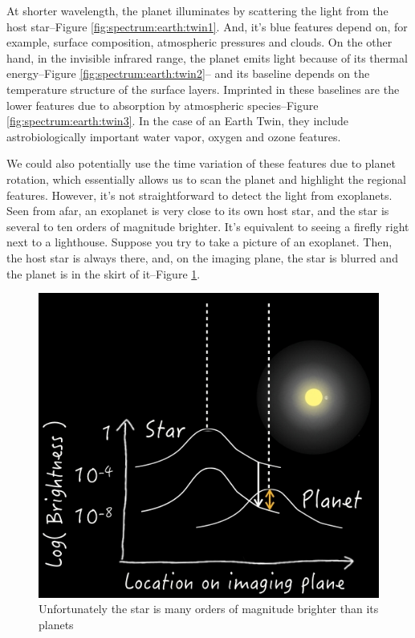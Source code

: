 \documentclass[]{article}
\begin{document}
At shorter wavelength,
the planet illuminates
by scattering the light
from the host star--Figure \ref{fig:spectrum:earth:twin1}.
And, it's blue features depend on,
for example,
surface composition,
atmospheric pressures and clouds.
On the other hand,
in the invisible infrared range,
the planet emits light
because of its thermal energy--Figure \ref{fig:spectrum:earth:twin2}--
and its baseline depends on
the temperature structure
of the surface layers.
Imprinted in these baselines
are the lower features
due to absorption
by atmospheric species--Figure \ref{fig:spectrum:earth:twin3}.
In the case of an Earth Twin,
they include astrobiologically important
water vapor, oxygen
and ozone features.

We could also potentially use
the time variation of these features
due to planet rotation,
which essentially allows us
to scan the planet
and highlight the regional features.
However, it's not straightforward
to detect the light from exoplanets.
Seen from afar, an exoplanet is
very close to its own host star,
and the star is several to ten
orders of magnitude brighter.
It's equivalent to seeing a firefly
right next to a lighthouse.
Suppose you try to take a picture
of an exoplanet.
Then, the host star is always there,
and, on the imaging plane,
the star is blurred
and the planet is in the skirt of it--Figure \ref{fig:StarIsMuchBrighter}.

\begin{figure}[H]
	\caption[The star is many orders of magnitude brighter than its planets]{Unfortunately the star is many orders of magnitude brighter than its planets}\label{fig:StarIsMuchBrighter}
	\includegraphics[width=\textwidth]{StarIsMuchBrighter}
\end{figure}
\end{document}
